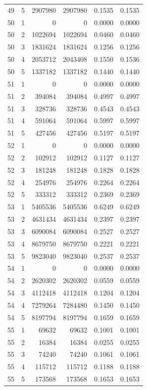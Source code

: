 \begin{longtable}{rrrrrr}
49 & 5 & 2907980 & 2907980 & 0.1535 & 0.1535 \\
50 & 1 & 0 & 0 & 0.0000 & 0.0000 \\
50 & 2 & 1022694 & 1022694 & 0.0460 & 0.0460 \\
50 & 3 & 1831624 & 1831624 & 0.1256 & 0.1256 \\
50 & 4 & 2053712 & 2043408 & 0.1550 & 0.1536 \\
50 & 5 & 1337182 & 1337182 & 0.1440 & 0.1440 \\
51 & 1 & 0 & 0 & 0.0000 & 0.0000 \\
51 & 2 & 394084 & 394084 & 0.4997 & 0.4997 \\
51 & 3 & 328736 & 328736 & 0.4543 & 0.4543 \\
51 & 4 & 591064 & 591064 & 0.5997 & 0.5997 \\
51 & 5 & 427456 & 427456 & 0.5197 & 0.5197 \\
52 & 1 & 0 & 0 & 0.0000 & 0.0000 \\
52 & 2 & 102912 & 102912 & 0.1127 & 0.1127 \\
52 & 3 & 181248 & 181248 & 0.1828 & 0.1828 \\
52 & 4 & 254976 & 254976 & 0.2264 & 0.2264 \\
52 & 5 & 333312 & 333312 & 0.2369 & 0.2369 \\
53 & 1 & 5405536 & 5405536 & 0.6249 & 0.6249 \\
53 & 2 & 4631434 & 4631434 & 0.2397 & 0.2397 \\
53 & 3 & 6090084 & 6090084 & 0.2527 & 0.2527 \\
53 & 4 & 8679750 & 8679750 & 0.2221 & 0.2221 \\
53 & 5 & 9823040 & 9823040 & 0.2537 & 0.2537 \\
54 & 1 & 0 & 0 & 0.0000 & 0.0000 \\
54 & 2 & 2620302 & 2620302 & 0.0559 & 0.0559 \\
54 & 3 & 4112418 & 4112418 & 0.1204 & 0.1204 \\
54 & 4 & 7279264 & 7284480 & 0.1450 & 0.1450 \\
54 & 5 & 8197794 & 8197794 & 0.1659 & 0.1659 \\
55 & 1 & 69632 & 69632 & 0.1001 & 0.1001 \\
55 & 2 & 16384 & 16384 & 0.0255 & 0.0255 \\
55 & 3 & 74240 & 74240 & 0.1061 & 0.1061 \\
55 & 4 & 115712 & 115712 & 0.1188 & 0.1188 \\
55 & 5 & 173568 & 173568 & 0.1653 & 0.1653 \\

\end{longtable}
